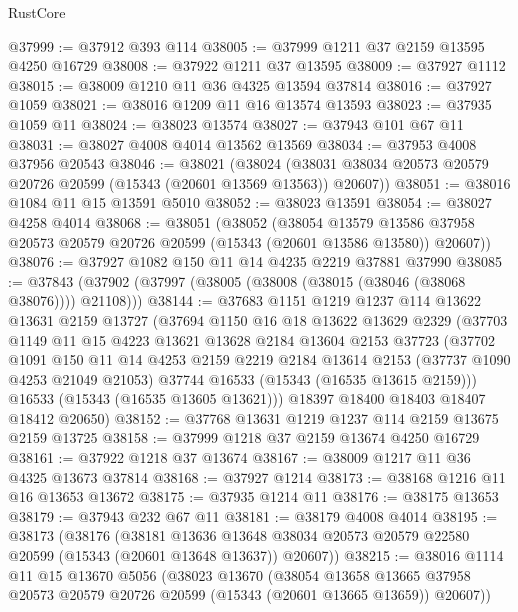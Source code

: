 \begin{lexlean}{RustCore}
\begin{coremodule}
@37999 := @37912 @393 @114
@38005 := @37999 @1211 @37 @2159 @13595 @4250 @16729
@38008 := @37922 @1211 @37 @13595
@38009 := @37927 @1112
@38015 := @38009 @1210 @11 @36 @4325 @13594 @37814
@38016 := @37927 @1059
@38021 := @38016 @1209 @11 @16 @13574 @13593
@38023 := @37935 @1059 @11
@38024 := @38023 @13574
@38027 := @37943 @101 @67 @11
@38031 := @38027 @4008 @4014 @13562 @13569
@38034 := @37953 @4008 @37956 @20543
@38046 := @38021
    (@38024 (@38031 @38034 @20573 @20579 @20726 @20599 (@15343 (@20601 @13569 @13563)) @20607))
@38051 := @38016 @1084 @11 @15 @13591 @5010
@38052 := @38023 @13591
@38054 := @38027 @4258 @4014
@38068 := @38051
    (@38052
      (@38054
        @13579
        @13586
        @37958
        @20573
        @20579
        @20726
        @20599
        (@15343 (@20601 @13586 @13580))
        @20607))
@38076 := @37927 @1082 @150 @11 @14 @4235 @2219 @37881 @37990
@38085 := @37843 (@37902 (@37997 (@38005 (@38008 (@38015 (@38046 (@38068 @38076)))) @21108)))
@38144 := @37683
    @1151
    @1219
    @1237
    @114
    @13622
    @13631
    @2159
    @13727
    (@37694
      @1150
      @16
      @18
      @13622
      @13629
      @2329
      (@37703
        @1149
        @11
        @15
        @4223
        @13621
        @13628
        @2184
        @13604
        @2153
        @37723
        (@37702
          @1091
          @150
          @11
          @14
          @4253
          @2159
          @2219
          @2184
          @13614
          @2153
          (@37737 @1090 @4253 @21049 @21053)
          @37744
          @16533
          (@15343 (@16535 @13615 @2159)))
        @16533
        (@15343 (@16535 @13605 @13621)))
      @18397
      @18400
      @18403
      @18407
      @18412
      @20650)
@38152 := @37768 @13631 @1219 @1237 @114 @2159 @13675 @2159 @13725
@38158 := @37999 @1218 @37 @2159 @13674 @4250 @16729
@38161 := @37922 @1218 @37 @13674
@38167 := @38009 @1217 @11 @36 @4325 @13673 @37814
@38168 := @37927 @1214
@38173 := @38168 @1216 @11 @16 @13653 @13672
@38175 := @37935 @1214 @11
@38176 := @38175 @13653
@38179 := @37943 @232 @67 @11
@38181 := @38179 @4008 @4014
@38195 := @38173
    (@38176
      (@38181
        @13636
        @13648
        @38034
        @20573
        @20579
        @22580
        @20599
        (@15343 (@20601 @13648 @13637))
        @20607))
@38215 := @38016
    @1114
    @11
    @15
    @13670
    @5056
    (@38023
      @13670
      (@38054
        @13658
        @13665
        @37958
        @20573
        @20579
        @20726
        @20599
        (@15343 (@20601 @13665 @13659))
        @20607))

\end{coremodule}
\end{lexlean}
